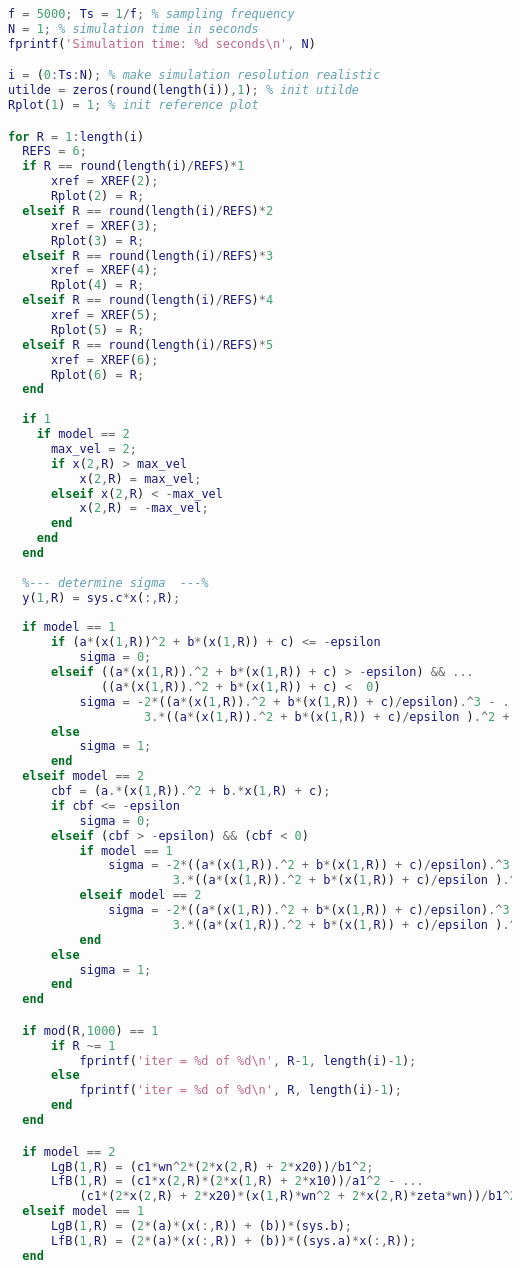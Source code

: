 \begin{lstlisting}[language=matlab]
f = 5000; Ts = 1/f; % sampling frequency
N = 1; % simulation time in seconds
fprintf('Simulation time: %d seconds\n', N)

i = (0:Ts:N); % make simulation resolution realistic
utilde = zeros(round(length(i)),1); % init utilde
Rplot(1) = 1; % init reference plot

for R = 1:length(i)
  REFS = 6;
  if R == round(length(i)/REFS)*1
      xref = XREF(2);
      Rplot(2) = R;
  elseif R == round(length(i)/REFS)*2
      xref = XREF(3);
      Rplot(3) = R;
  elseif R == round(length(i)/REFS)*3
      xref = XREF(4);
      Rplot(4) = R;
  elseif R == round(length(i)/REFS)*4
      xref = XREF(5);
      Rplot(5) = R;
  elseif R == round(length(i)/REFS)*5
      xref = XREF(6);
      Rplot(6) = R;
  end
  
  if 1
    if model == 2
      max_vel = 2;
      if x(2,R) > max_vel
          x(2,R) = max_vel;
      elseif x(2,R) < -max_vel
          x(2,R) = -max_vel;
      end
    end
  end
 
  %--- determine sigma  ---%
  y(1,R) = sys.c*x(:,R);
  
  if model == 1
      if (a*(x(1,R))^2 + b*(x(1,R)) + c) <= -epsilon
          sigma = 0;
      elseif ((a*(x(1,R)).^2 + b*(x(1,R)) + c) > -epsilon) && ...
             ((a*(x(1,R)).^2 + b*(x(1,R)) + c) <  0)
          sigma = -2*((a*(x(1,R)).^2 + b*(x(1,R)) + c)/epsilon).^3 - ...
                   3.*((a*(x(1,R)).^2 + b*(x(1,R)) + c)/epsilon ).^2 + 1;
      else
          sigma = 1;
      end
  elseif model == 2
      cbf = (a.*(x(1,R)).^2 + b.*x(1,R) + c);
      if cbf <= -epsilon
          sigma = 0;
      elseif (cbf > -epsilon) && (cbf < 0)
          if model == 1
              sigma = -2*((a*(x(1,R)).^2 + b*(x(1,R)) + c)/epsilon).^3 - ...
                       3.*((a*(x(1,R)).^2 + b*(x(1,R)) + c)/epsilon ).^2 + 1;
          elseif model == 2
              sigma = -2*((a*(x(1,R)).^2 + b*(x(1,R)) + c)/epsilon).^3 - ...
                       3.*((a*(x(1,R)).^2 + b*(x(1,R)) + c)/epsilon ).^2 + 1;
          end
      else
          sigma = 1;
      end 
  end

  if mod(R,1000) == 1 
      if R ~= 1
          fprintf('iter = %d of %d\n', R-1, length(i)-1);
      else
          fprintf('iter = %d of %d\n', R, length(i)-1);
      end
  end

  if model == 2
      LgB(1,R) = (c1*wn^2*(2*x(2,R) + 2*x20))/b1^2;
      LfB(1,R) = (c1*x(2,R)*(2*x(1,R) + 2*x10))/a1^2 - ...
          (c1*(2*x(2,R) + 2*x20)*(x(1,R)*wn^2 + 2*x(2,R)*zeta*wn))/b1^2;  
  elseif model == 1
      LgB(1,R) = (2*(a)*(x(:,R)) + (b))*(sys.b);
      LfB(1,R) = (2*(a)*(x(:,R)) + (b))*((sys.a)*x(:,R));
  end
  

\end{lstlisting}
